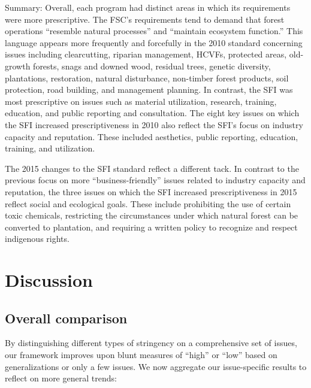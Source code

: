 \documentclass[
      12pt,
            Review ]{article}
\begin{document}
Summary: Overall, each program had distinct areas in which its
requirements were more prescriptive. The FSC's requirements tend to
demand that forest operations ``resemble natural processes'' and
``maintain ecosystem function.'' This language appears more frequently
and forcefully in the 2010 standard concerning issues including
clearcutting, riparian management, HCVFs, protected areas, old-growth
forests, snags and downed wood, residual trees, genetic diversity,
plantations, restoration, natural disturbance, non-timber forest
products, soil protection, road building, and management planning. In
contrast, the SFI was most prescriptive on issues such as material
utilization, research, training, education, and public reporting and
consultation. The eight key issues on which the SFI increased
prescriptiveness in 2010 also reflect the SFI's focus on industry
capacity and reputation. These included aesthetics, public reporting,
education, training, and utilization.

The 2015 changes to the SFI standard reflect a different tack. In
contrast to the previous focus on more ``business-friendly'' issues
related to industry capacity and reputation, the three issues on which
the SFI increased prescriptiveness in 2015 reflect social and ecological
goals. These include prohibiting the use of certain toxic chemicals,
restricting the circumstances under which natural forest can be
converted to plantation, and requiring a written policy to recognize and
respect indigenous rights.

\section{Discussion}\label{discussion}

\subsection{Overall comparison}\label{overall-comparison}

By distinguishing different types of stringency on a comprehensive set
of issues, our framework improves upon blunt measures of ``high'' or
``low'' based on generalizations or only a few issues. We now aggregate
our issue-specific results to reflect on more general trends:
\end{document}
